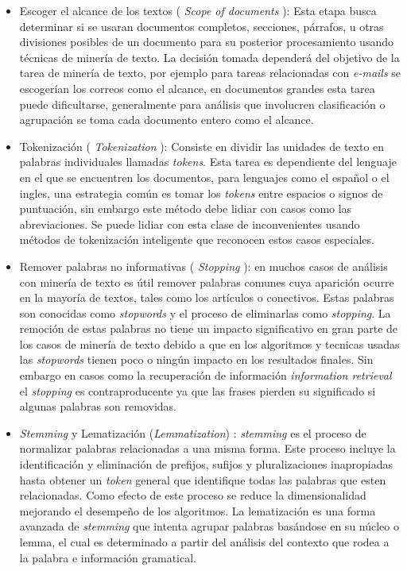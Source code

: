     \begin{itemize}
        \item Escoger el alcance de los textos ( \textit{Scope of documents} ): Esta etapa busca determinar si se usaran documentos completos, secciones, párrafos, u otras divisiones posibles de un documento para su posterior procesamiento usando técnicas de minería de texto. La decisión tomada dependerá del objetivo de la tarea de minería de texto, por ejemplo para tareas relacionadas con \textit{ e-mails } se escogerían los correos como el alcance, en documentos grandes esta tarea puede dificultarse, generalmente para análisis que involucren clasificación o agrupación se toma cada documento entero como el alcance.\cite{txtMiningGaryMiner}
        \item Tokenización ( \textit{Tokenization} ): Consiste en dividir las unidades de texto en palabras individuales llamadas \textit{tokens}. Esta tarea es dependiente del lenguaje en el que se encuentren los documentos, para lenguajes como el español o el ingles, una estrategia común es tomar los \textit{tokens} entre espacios o signos de puntuación, sin embargo este método debe lidiar con casos como las abreviaciones. Se puede lidiar con esta clase de inconvenientes usando métodos de tokenización inteligente que reconocen estos casos especiales.\cite{txtMiningGaryMiner}
    \item Remover palabras no informativas ( \textit{Stopping} ): en muchos casos de análisis con minería de texto es útil remover palabras comunes cuya aparición ocurre en la mayoría de textos, tales como los artículos o conectivos. Estas palabras son conocidas como \textit{stopwords} y el proceso de eliminarlas como \textit{stopping}. La remoción de estas palabras no tiene un impacto significativo en gran parte de los casos de minería de texto debido a que en los algoritmos y tecnicas usadas las \textit{stopwords} tienen poco o ningún impacto en los resultados finales. Sin embargo en casos como la recuperación de información \textit{information retrieval} el \textit{stopping} es contraproducente ya que las frases pierden su significado si algunas palabras son removidas.\cite{txtMiningGaryMiner}

    \item \textit{Stemming} y Lematización (\textit{Lemmatization}) :  \textit{stemming} es el proceso de normalizar palabras relacionadas a una misma forma. Este proceso incluye la identificación y eliminación de prefijos, sufijos y pluralizaciones inapropiadas hasta obtener un \textit{token} general que identifique todas las palabras que esten relacionadas. Como efecto de este proceso se reduce la dimensionalidad mejorando el desempeño de los algoritmos. La lematización es una forma avanzada de \textit{stemming} que intenta agrupar palabras basándose en su núcleo o lemma, el cual es determinado a partir del análisis del contexto que rodea a la palabra e información gramatical.\cite{txtMiningGaryMiner}


    \end{itemize}

